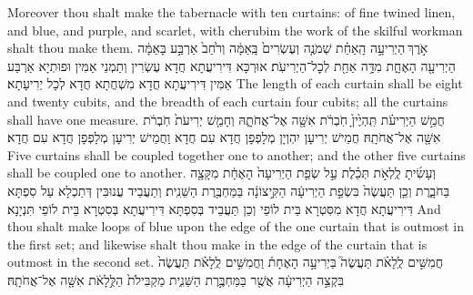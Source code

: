 {{Moreover thou shalt make the tabernacle with ten curtains: of fine twined linen, and blue, and purple, and scarlet, with cherubim the work of the skilful workman shalt thou make them.}{}
{אֹ֣רֶךְ \legarmeh  הַיְרִיעָ֣ה הָֽאַחַ֗ת שְׁמֹנֶ֤ה וְעֶשְׂרִים֙ בָּֽאַמָּ֔ה וְרֹ֙חַב֙ אַרְבַּ֣ע בָּאַמָּ֔ה הַיְרִיעָ֖ה הָאֶחָ֑ת מִדָּ֥ה אַחַ֖ת לְכׇל־הַיְרִיעֹֽת׃}
{אוּרְכָּא דִּירִיעֲתָא חֲדָא עֶשְׂרִין וְתַמְנֵי אַמִּין וּפוּתְיָא אַרְבַּע אַמִּין דִּירִיעֲתָא חֲדָא מִשְׁחֲתָא חֲדָא לְכָל יְרִיעָתָא׃}
{The length of each curtain shall be eight and twenty cubits, and the breadth of each curtain four cubits; all the curtains shall have one measure.}{}
{חֲמֵ֣שׁ הַיְרִיעֹ֗ת תִּֽהְיֶ֙יןָ֙ חֹֽבְרֹ֔ת אִשָּׁ֖ה אֶל־אֲחֹתָ֑הּ וְחָמֵ֤שׁ יְרִיעֹת֙ חֹֽבְרֹ֔ת אִשָּׁ֖ה אֶל־אֲחֹתָֽהּ׃
}
{חֲמֵישׁ יְרִיעָן יִהְוְיָן מְלָפְפָן חֲדָא עִם חֲדָא וַחֲמֵישׁ יְרִיעָן מְלָפְפָן חֲדָא עִם חֲדָא׃}
{Five curtains shall be coupled together one to another; and the other five curtains shall be coupled one to another.}{}
{וְעָשִׂ֜יתָ לֻֽלְאֹ֣ת תְּכֵ֗לֶת עַ֣ל שְׂפַ֤ת הַיְרִיעָה֙ הָאֶחָ֔ת מִקָּצָ֖ה בַּחֹבָ֑רֶת וְכֵ֤ן תַּעֲשֶׂה֙ בִּשְׂפַ֣ת הַיְרִיעָ֔ה הַקִּ֣יצוֹנָ֔ה בַּמַּחְבֶּ֖רֶת הַשֵּׁנִֽית׃
}
{וְתַעֲבֵיד עֲנוּבִּין דְּתַכְלָא עַל סִפְתָּא דִּירִיעֲתָא חֲדָא מִסִּטְרָא בֵּית לוֹפֵי וְכֵן תַּעֲבֵיד בְּסִפְתָּא דִּירִיעֲתָא בְּסִטְרָא בֵּית לוֹפֵי תִּנְיָנָא׃}
{And thou shalt make loops of blue upon the edge of the one curtain that is outmost in the first set; and likewise shalt thou make in the edge of the curtain that is outmost in the second set.}{}
{חֲמִשִּׁ֣ים לֻֽלָאֹ֗ת תַּעֲשֶׂה֮ בַּיְרִיעָ֣ה הָאֶחָת֒ וַחֲמִשִּׁ֣ים לֻֽלָאֹ֗ת תַּעֲשֶׂה֙ בִּקְצֵ֣ה הַיְרִיעָ֔ה אֲשֶׁ֖ר בַּמַּחְבֶּ֣רֶת הַשֵּׁנִ֑ית מַקְבִּילֹת֙ הַלֻּ֣לָאֹ֔ת אִשָּׁ֖ה אֶל־אֲחֹתָֽהּ׃
}}
